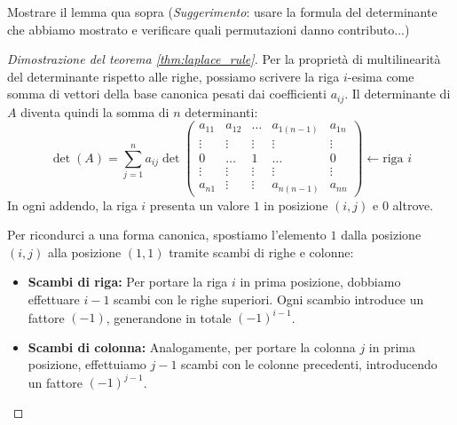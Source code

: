 \begin{exercise}
    Mostrare il lemma qua sopra (\emph{Suggerimento}: usare la formula del determinante che abbiamo mostrato e verificare quali permutazioni danno contributo...)
\end{exercise}
\begin{proof}[Dimostrazione del teorema \ref{thm:laplace_rule}]
Per la proprietà di multilinearità del determinante rispetto alle righe, possiamo scrivere la riga $i$-esima come somma di vettori della base canonica pesati dai coefficienti $a_{ij}$. Il determinante di $A$ diventa quindi la somma di $n$ determinanti:
\[
\det(A) = \sum_{j=1}^n a_{ij} \det \begin{pmatrix} 
a_{11} & a_{12} & \ldots & a_{1(n-1)} & a_{1n} \\ 
\vdots & \vdots & \vdots & \vdots & \vdots \\
0 & \dots & 1 & \dots & 0 \\ 
\vdots & \vdots & \vdots & \vdots & \vdots  \\
a_{n1} & \vdots & \vdots & a_{n(n-1)} & a_{nn} 
\end{pmatrix} \leftarrow \text{riga } i
\]
In ogni addendo, la riga $i$ presenta un valore $1$ in posizione $(i, j)$ e $0$ altrove.

Per ricondurci a una forma canonica, spostiamo l'elemento $1$ dalla posizione $(i, j)$ alla posizione $(1, 1)$ tramite scambi di righe e colonne:
\begin{itemize}
    \item \textbf{Scambi di riga:} Per portare la riga $i$ in prima posizione, dobbiamo effettuare $i-1$ scambi con le righe superiori. Ogni scambio introduce un fattore $(-1)$, generandone in totale $(-1)^{i-1}$.
    \item \textbf{Scambi di colonna:} Analogamente, per portare la colonna $j$ in prima posizione, effettuiamo $j-1$ scambi con le colonne precedenti, introducendo un fattore $(-1)^{j-1}$.
\end{itemize}


\end{proof}
